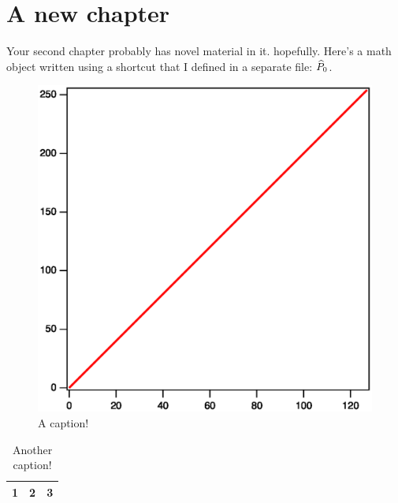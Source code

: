 \chapter{A new chapter}
Your second chapter probably has novel material in it. hopefully. Here's a math object written using a shortcut that I defined in a separate file: $\widehat{P}_0$.





\begin{figure}[ht]
\centering
\includegraphics[width=.45\textwidth]{name_of_figure.eps}
\caption{A caption! \label{a_figure}}
\end{figure}

\begin{table}
\centering
\begin{tabular}{c|c|c}
 1 & 2 & 3 \\
\hline
\end{tabular}
\caption{Another caption! \label{a_table}}
\end{table}
